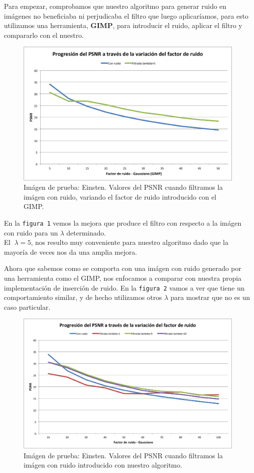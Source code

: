 \documentclass[a4paper]{article}
\begin{document}
Para empezar, comprobamos que nuestro algoritmo para generar ruido en imágenes no beneficiaba ni perjudicaba el filtro que luego aplicaríamos, para esto utilizamos una herramienta, \textbf{GIMP}, para introducir el ruido, aplicar el filtro y compararlo con el nuestro.

\begin{figure}[H]
  \centering
  \includegraphics[scale=0.75]{graficos/PSNR_Einstein-GIMP.png}
  \caption{ Imágen de prueba: Einsten. Valores del PSNR cuando filtramos la imágen con ruido, variando el factor de ruido introducido con el GIMP.}
\end{figure}

En la \texttt{figura 1}  vemos la mejora que produce el filtro con respecto a la imágen con ruido para un $\lambda$ determinado. \\ 
El $\ \lambda = 5$, nos resulto muy conveniente para nuestro algoritmo dado que la mayoría de veces nos da una amplia mejora. 

Ahora que sabemos como se comporta con una imágen con ruido generado por una herramienta como el GIMP, nos enfocamos a comparar con nuestra propia implementación de inserción de ruido.
En la \texttt{figura 2} vamos a ver que tiene un comportamiento similar, y de hecho utilizamos otros $\lambda$ para mostrar que no es un caso particular. 
\begin{figure}[H]
  \centering
  \includegraphics[scale=0.65]{graficos/PSNR_Einstein.png}
  \caption{ Imágen de prueba: Einsten. Valores del PSNR cuando filtramos la imágen con ruido introducido con nuestro algoritmo. }
\end{figure}
\end{document}
